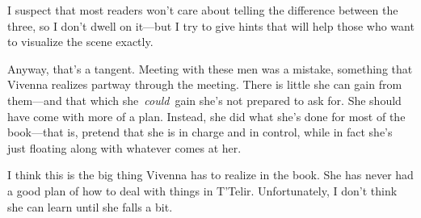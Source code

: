 I suspect that most readers won’t care about telling the difference between the three, so I don’t dwell on it—but I try to give hints that will help those who want to visualize the scene exactly.

Anyway, that’s a tangent. Meeting with these men was a mistake, something that Vivenna realizes partway through the meeting. There is little she can gain from them—and that which she~\textit{could}~gain she’s not prepared to ask for. She should have come with more of a plan. Instead, she did what she’s done for most of the book—that is, pretend that she is in charge and in control, while in fact she’s just floating along with whatever comes at her.

I think this is the big thing Vivenna has to realize in the book. She has never had a good plan of how to deal with things in T’Telir. Unfortunately, I don’t think she can learn until she falls a bit.



